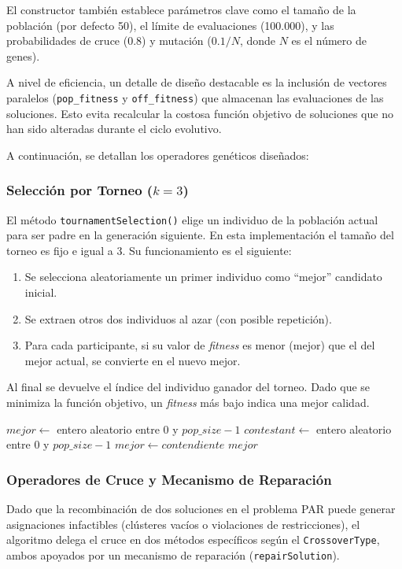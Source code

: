 \documentclass[a4paper,12pt]{article}%
\begin{document}
El constructor también establece parámetros clave como el tamaño de la población (por defecto 50), el límite de evaluaciones (100.000), y las probabilidades de cruce ($0.8$) y mutación ($0.1/N$, donde $N$ es el número de genes).

A nivel de eficiencia, un detalle de diseño destacable es la inclusión de vectores paralelos (\texttt{pop\_fitness} y \texttt{off\_fitness}) que almacenan las evaluaciones de las soluciones. Esto evita recalcular la costosa función objetivo de soluciones que no han sido alteradas durante el ciclo evolutivo.

A continuación, se detallan los operadores genéticos diseñados:

\subsubsection*{Selección por Torneo ($k=3$)}
\noindent El método \texttt{tournamentSelection()} elige un individuo de la población actual para ser padre en la generación siguiente. En esta implementación el tamaño del torneo es fijo e igual a 3. Su funcionamiento es el siguiente:
\begin{enumerate}
	\item Se selecciona aleatoriamente un primer individuo como ``mejor'' candidato inicial.
	\item Se extraen otros dos individuos al azar (con posible repetición).
	\item Para cada participante, si su valor de \textit{fitness} es menor (mejor) que el del mejor actual, se convierte en el nuevo mejor.
\end{enumerate}
Al final se devuelve el índice del individuo ganador del torneo. Dado que se minimiza la función objetivo, un \textit{fitness} más bajo indica una mejor calidad.

\begin{algorithm}
	\begin{algorithmic}
		\State $mejor \leftarrow$ entero aleatorio entre $0$ y $pop\_size-1$
		\State $contestant \leftarrow$ entero aleatorio entre $0$ y $pop\_size-1$
		\State $mejor \leftarrow contendiente$
		\EndIf
		\EndFor
		\State \Return $mejor$
		\EndFunction
	\end{algorithmic}
\end{algorithm}

\subsubsection*{Operadores de Cruce y Mecanismo de Reparación}
\noindent Dado que la recombinación de dos soluciones en el problema PAR puede generar asignaciones infactibles (clústeres vacíos o violaciones de restricciones), el algoritmo delega el cruce en dos métodos específicos según el \texttt{CrossoverType}, ambos apoyados por un mecanismo de reparación (\texttt{repairSolution}).
\end{document}
